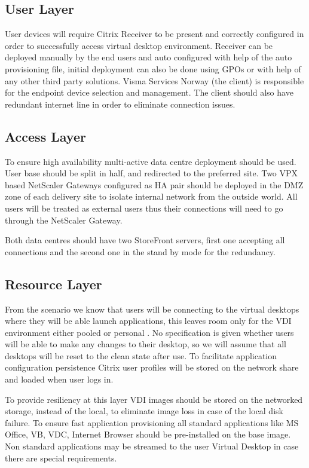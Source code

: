 \documentclass[a4paper]{article}
\begin{document}
	\subsection{User Layer}
	User devices will require Citrix Receiver to be present and correctly configured in order to successfully access virtual desktop environment. Receiver can be deployed manually by the end users and auto configured with help of the auto provisioning file, initial deployment can also be done using GPOs or with help of any other third party solutions. Visma Services Norway (the client) is responsible for the endpoint device selection and management. The client should also have redundant internet line in order to eliminate connection issues.
	\subsection{Access Layer}
	To ensure high availability multi-active data centre deployment should be used. User base should be split in half, and redirected to the preferred site. Two VPX based NetScaler Gateways configured as HA pair should be deployed in the DMZ zone of each delivery site to isolate internal network from the outside world. All users will be treated as external users thus their connections will need to go through the NetScaler Gateway.
	
	Both data centres should have two StoreFront servers, first one accepting all connections and the second one in the stand by mode for the redundancy.  
	\subsection{Resource Layer}
	From the scenario we know that users will be connecting to the virtual desktops where they will be able launch applications, this leaves room only for the VDI environment either pooled  or personal . No specification is given whether users will be able to make any changes to their desktop, so we will assume that all desktops will be reset to the clean state after use. To facilitate application configuration persistence Citrix user profiles will be stored on the network share and loaded when user logs in.
	
	To provide resiliency at this layer VDI images should be stored on the networked storage, instead of the local, to eliminate image loss in case of the local disk failure. To ensure fast application provisioning all standard applications like MS Office, VB, VDC, Internet Browser should be pre-installed on the base image. Non standard applications may be streamed to the user Virtual Desktop in case there are special requirements.
\end{document}
